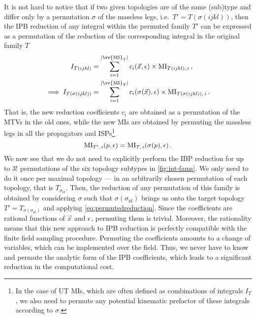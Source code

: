 \documentclass[main.tex]{subfiles}
\begin{document}
It is not hard to notice that if two given topologies are of the same (sub)type and differ only by a permutation $\sigma$ of the massless legs, i.e.~$T'=T(\sigma(ijkl))$, then the IPB reduction of any integral within the permuted family $T'$ can be expressed as a permutation of the reduction of the corresponding integral in the original family $T$ 
\begin{subequations}
\begin{align}
	I_{T(ijkl)} &= \sum_{i=1}^{|\vv{\text{MI}}_T|} c_i(\vec{x}, \eps) \times \text{MI}_{T(ijkl),\,i} \,, \\
	\implies I_{T(\sigma(ijkl))} &= \sum_{i=1}^{|\vv{\text{MI}}_T|} c_i(\sigma(\vec{x}), \eps) \times \text{MI}_{T(\sigma(ijkl)),\,i}\,. \label{eq:permutedreduction}
\end{align}
\end{subequations}
 That is, the new reduction coefficients $c_i$ are obtained as a permutation of the MTVs in the old ones, while the new MIs are obtained by permuting the massless legs in all the propagators and ISPs\footnote{In the case of UT MIs, which are often defined as combinations of integrals $I_T$, we also need to permute any potential kinematic prefactor of these integrals according to $\sigma$.}
\begin{equation}
	\text{MI}_{T',\,i}(p, \epsilon) = \text{MI}_{T,\,i} (\sigma(p), \epsilon)\,.
\end{equation}
We now see that we do not need to explicitly perform the IBP reduction for up to $3!$ permutations of the six topology subtypes in \cref{fig:int-fams}. We only need to do it once per maximal topology --- in an arbitrarily chosen permutation of each topology, that is $T_{\sigma_\text{id}}$. Then, the reduction of any permutation of this family is obtained by considering $\sigma$ such that $\sigma(\sigma_{\text{id}})$ brings us onto the target topology $T' = T_{\sigma(\sigma_\text{id})}$ and applying \cref{eq:permutedreduction}. Since the coefficients are rational functions of $\vec{x}$ and $\epsilon$, permuting them is trivial. Moreover, the rationality means that this new approach to IPB reduction is perfectly compatible with the finite field sampling procedure. Permuting the coefficients amounts to a change of variables, which can be implemented over the field. Thus, we never have to know and permute the analytic form of the IPB coefficients, which leads to a significant reduction in the computational cost.
\end{document}
